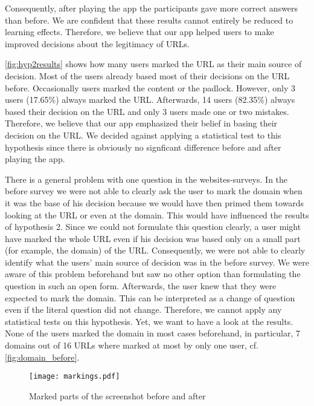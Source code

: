 \begin{description}[leftmargin=0cm]
Consequently, after playing the app the participants gave more correct answers than before.
We are confident that these results cannot entirely be reduced to learning effects.
Therefore, we believe that our app helped users to make improved decisions about the legitimacy of URLs.
\item[Hypothesis 2:]
\autoref{fig:hyp2results} shows how many users marked the URL as their main source of decision.
Most of the users already based most of their decisions on the URL before.
Occasionally users marked the content or the padlock.
However, only 3 users (17.65\%) always marked the URL.
Afterwards, 14 users (82.35\%) always based their decision on the URL and only 3 users made one or two mistakes.
Therefore, we believe that our app emphasized their belief in basing their decision on the URL.
We decided against applying a statistical test to this hypothesis since there is obviously no signficant difference before and after playing the app.
\item[Hypothesis 3:]
There is a general problem with one question in the websites-surveys.
In the before survey we were not able to clearly ask the user to mark the domain when it was the base of his decision because we would have then primed them towards looking at the URL or even at the domain.
This would have influenced the results of hypothesis 2.
Since we could not formulate this question clearly, a user might have marked the whole URL even if his decision was based only on a small part (for example, the domain) of the URL.
Consequently, we were not able to clearly identify what the users' main source of decision was in the before survey.
We were aware of this problem beforehand but saw no other option than formulating the question in such an open form.
Afterwards, the user knew that they were expected to mark the domain.
This can be interpreted as a change of question even if the literal question did not change.
Therefore, we cannot apply any statistical tests on this hypothesis.
Yet, we want to have a look at the results.
None of the users marked the domain in most cases beforehand, in particular, 7 domains out of 16 URLs where marked at most by only one user, cf. \autoref{fig:domain_before}.
\begin{figure}
\centering
\texttt{[image: markings.pdf]}
\caption{Marked parts of the screenshot before and after}
\label{fig:markings}
\end{figure}


\end{description}
